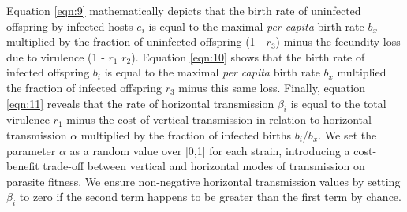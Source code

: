 Equation \ref{eqn:9} mathematically depicts that the birth rate of uninfected
offspring by infected hosts $e_i$ is equal to the maximal \emph{per capita}
birth rate $b_x$ multiplied by the fraction of uninfected offspring (1 - $r_3$)
minus the fecundity loss due to virulence (1 - $r_1$ $r_2$). Equation
\ref{eqn:10} shows that the birth rate of infected offspring $b_i$ is equal to
the maximal \emph{per capita} birth rate $b_x$ multiplied the fraction of
infected offspring $r_3$ minus this same loss. Finally, equation \ref{eqn:11}
reveals that the rate of horizontal transmission $\beta_i$ is equal to the
total virulence $r_1$ minus the cost of vertical transmission in relation to
horizontal transmission $\alpha$ multiplied by the fraction of infected births
$b_i$/$b_x$. We set the parameter $\alpha$ as a random value over [0,1] for each
strain, introducing a cost-benefit trade-off between vertical and horizontal
modes of transmission on parasite fitness. We ensure non-negative horizontal
transmission values by setting $\beta_i$ to zero if the second term happens to
be greater than the first term by chance.

